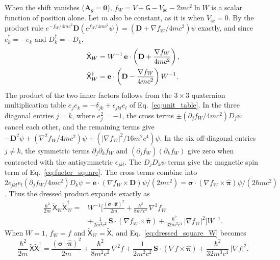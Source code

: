 \documentclass[aps,prd,onecolumn,tightenlines,nofootinbib,notitlepage,11pt,floatfix]{revtex4-2}
\theoremstyle{indentedtheorem}
\begin{document}
When the shift vanishes ($\mathbf{A}_g=\mathbf{0}$), $f_W = V + \mathsf{G} - V_\text{sc} - 2mc^2\ln W$ is a scalar function of position alone. Let $m$ also be constant, as it is when $V_\text{sc}=0$. By the product rule $e^{-f_W/4mc^2}\mathbf{D}(e^{f_W/4mc^2}\psi) = (\mathbf{D} + \nabla f_W/4mc^2)\psi$ exactly, and since $e_k^\dagger = -e_k$ and $D_k^\dagger = -D_k$,
\begin{align}
    \tilde{\mathsf{X}}_W &= W^{-1}\,\mathbf{e}\cdot\left(\mathbf{D}+\frac{\nabla f_W}{4mc^2}\right) , \notag\\
    \tilde{\mathsf{X}}_W^\dagger &= \mathbf{e}\cdot\left(\mathbf{D}-\frac{\nabla f_W}{4mc^2}\right)W^{-1} .
    \label{eq:dressed_product}
\end{align}
The product of the two inner factors follows from the $3\times 3$ quaternion multiplication table $e_j e_k = -\delta_{jk} + \epsilon_{jkl}e_l$ of Eq.~\eqref{eq:unit_table}. In the three diagonal entries $j=k$, where $e_j^2=-1$, the cross terms $\pm(\partial_j f_W/4mc^2)D_j\psi$ cancel each other, and the remaining terms give $-\mathbf{D}^2\psi + (\nabla^2 f_W/4mc^2)\psi + (|\nabla f_W|^2/16m^2c^4)\psi$. In the six off-diagonal entries $j\neq k$, the symmetric terms $\partial_j\partial_k f_W$ and $(\partial_j f_W)(\partial_k f_W)$ give zero when contracted with the antisymmetric $\epsilon_{jkl}$. The $D_j D_k\psi$ terms give the magnetic spin term of Eq.~\eqref{eq:fueter_square}. The cross terms combine into $2\epsilon_{jkl}e_l(\partial_j f_W/4mc^2)D_k\psi = \mathbf{e}\cdot(\nabla f_W\times\mathbf{D})\psi/(2mc^2) = \boldsymbol{\sigma}\cdot(\nabla f_W\times\hat{\boldsymbol{\pi}})\psi/(2\hbar mc^2)$. Thus the dressed product expands exactly as
\begin{equation}
    \begin{split}\frac{\hbar^2}{2m}\,\tilde{\mathsf{X}}_W\tilde{\mathsf{X}}_W^\dagger = {}& W^{-1}\!\bigg[\frac{(\boldsymbol{\sigma}\cdot\hat{\boldsymbol{\pi}})^2}{2m} + \frac{\hbar^2}{8m^2c^2}\,\nabla^2f_W \\ & + \frac{1}{2m^2c^2}\,\mathbf{S}\cdot(\nabla f_W\times\hat{\boldsymbol{\pi}}) + \frac{\hbar^2}{32m^3c^4}\,|\nabla f_W|^2\bigg]\!W^{-1} .\end{split}
    \label{eq:dressed_square_W}
\end{equation}
When $W=1$, $f_W=f$ and $\tilde{\mathsf{X}}_W=\tilde{\mathsf{X}}$, and Eq.~\eqref{eq:dressed_square_W} becomes
\begin{equation}
    \frac{\hbar^2}{2m}\,\tilde{\mathsf{X}}\tilde{\mathsf{X}}^\dagger = \frac{(\boldsymbol{\sigma}\cdot\hat{\boldsymbol{\pi}})^2}{2m} + \frac{\hbar^2}{8m^2c^2}\,\nabla^2f + \frac{1}{2m^2c^2}\,\mathbf{S}\cdot(\nabla f\times\hat{\boldsymbol{\pi}}) + \frac{\hbar^2}{32m^3c^4}\,|\nabla f|^2 .
    \label{eq:dressed_square_expanded}
\end{equation}
\end{document}
